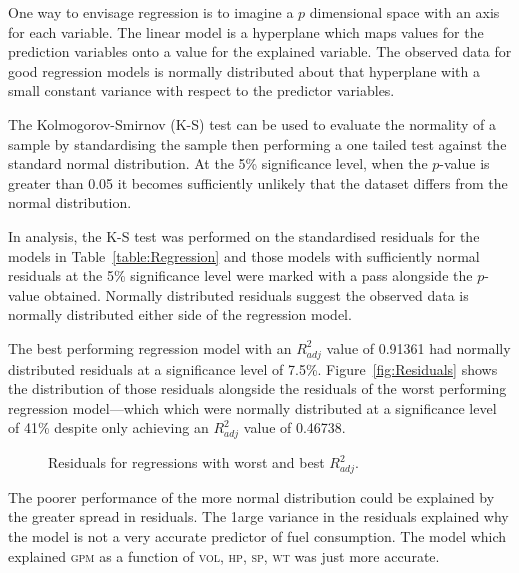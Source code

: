 \documentclass[a4paper,10pt,twocolumn]{article}
\newcommand{\GPM}{\textsc{gpm}\xspace}
\newcommand{\VOL}{\textsc{vol}\xspace}
\newcommand{\HP}{\textsc{hp}\xspace}
\newcommand{\SP}{\textsc{sp}\xspace}
\newcommand{\WT}{\textsc{wt}\xspace}
\begin{document}
One way to envisage regression is to imagine a $p$ dimensional space with 
an axis for each variable. The linear model is a hyperplane which maps values 
for the prediction variables onto a value for the explained variable. The 
observed data for good regression models is normally distributed about that 
hyperplane with a small constant variance with respect to the predictor 
variables.

The Kolmogorov-Smirnov (K-S) test can be used to evaluate the normality of a 
sample by standardising the sample then performing a one tailed test against  
the standard normal distribution. At the 5\% significance level, when the  
$p$-value is greater than 0.05 it becomes sufficiently unlikely that the 
dataset differs from the normal distribution.

In analysis, the K-S test was performed on the standardised residuals for the 
models in Table~\vref{table:Regression} and those models with sufficiently 
normal residuals at the 5\% significance level were marked with a pass 
alongside the $p$-value obtained. Normally distributed residuals suggest the 
observed data is normally distributed either side of the regression model.

The best performing regression model with an $R_{adj}^2$ value of 0.91361 had 
normally distributed residuals at a significance level of 7.5\%. 
Figure~\vref{fig:Residuals} shows the distribution of those residuals alongside 
the residuals of the worst performing regression model---which which were 
normally distributed at a significance level of 41\% despite only achieving an 
$R_{adj}^2$ value of 0.46738.

\begin{figure}[h]
    \centering
    \def\svgwidth{0.5\textwidth}
    
    \caption{Residuals for regressions with worst and best $R_{adj}^2$.}
    \label{fig:Residuals}
\end{figure}

The poorer performance of the more normal distribution could be explained by 
the greater spread in residuals. The 1arge variance in the residuals explained 
why the model is not a very accurate predictor of fuel consumption. The model 
which explained \GPM as a function of \VOL, \HP, \SP, \WT was just more 
accurate.

\printbibliography

\clearpage

\end{document}
